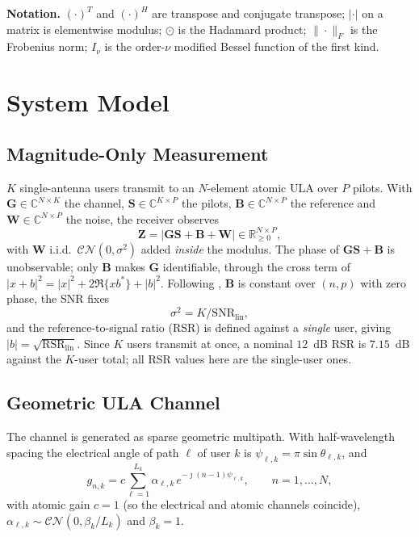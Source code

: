 \documentclass[conference]{IEEEtran}
\newcommand{\bG}{\mathbf{G}}
\newcommand{\bS}{\mathbf{S}}
\newcommand{\bB}{\mathbf{B}}
\newcommand{\bW}{\mathbf{W}}
\newcommand{\bZ}{\mathbf{Z}}
\newcommand{\CN}{\mathcal{CN}}
\begin{document}
\textbf{Notation.} $(\cdot)^{T}$ and $(\cdot)^{H}$ are transpose and conjugate
transpose; $|\cdot|$ on a matrix is elementwise modulus; $\odot$ is the Hadamard
product; $\|\cdot\|_F$ is the Frobenius norm; $I_\nu$ is the order-$\nu$
modified Bessel function of the first kind.

\section{System Model}\label{sec:model}
\subsection{Magnitude-Only Measurement}
$K$ single-antenna users transmit to an $N$-element atomic ULA over $P$
pilots. With $\bG\in\mathbb{C}^{N\times K}$ the channel,
$\bS\in\mathbb{C}^{K\times P}$ the pilots, $\bB\in\mathbb{C}^{N\times P}$ the
reference and $\bW\in\mathbb{C}^{N\times P}$ the noise, the receiver observes
\begin{equation}\label{eq:obs}
\bZ=\bigl|\bG\bS+\bB+\bW\bigr|\in\mathbb{R}_{\ge0}^{N\times P},
\end{equation}
with $\bW$ i.i.d.\ $\CN(0,\sigma^2)$ added \emph{inside} the modulus. The
phase of $\bG\bS+\bB$ is unobservable; only $\bB$ makes $\bG$ identifiable,
through the cross term of $|x+b|^2=|x|^2+2\Re\{xb^*\}+|b|^2$. Following
\cite{cui2025}, $\bB$ is constant over $(n,p)$ with zero phase, the SNR fixes
\begin{equation}\label{eq:snr}
\sigma^2=K/\mathrm{SNR}_{\mathrm{lin}},
\end{equation}
and the reference-to-signal ratio (RSR) is defined against a \emph{single}
user, giving $|b|=\sqrt{\mathrm{RSR}_{\mathrm{lin}}}$. Since $K$ users
transmit at once, a nominal $12$~dB RSR is $7.15$~dB against the $K$-user
total; all RSR values here are the single-user ones.

\subsection{Geometric ULA Channel}
The channel is generated as sparse geometric multipath. With half-wavelength
spacing the electrical angle of path $\ell$ of user $k$ is
$\psi_{\ell,k}=\pi\sin\theta_{\ell,k}$, and
\begin{equation}\label{eq:chan}
g_{n,k}=c\sum_{\ell=1}^{L_k}\alpha_{\ell,k}\,
e^{-\jmath(n-1)\psi_{\ell,k}},\qquad n=1,\dots,N,
\end{equation}
with atomic gain $c=1$ (so the electrical and atomic channels coincide),
$\alpha_{\ell,k}\sim\CN(0,\beta_k/L_k)$ and $\beta_k=1$.
\end{document}
